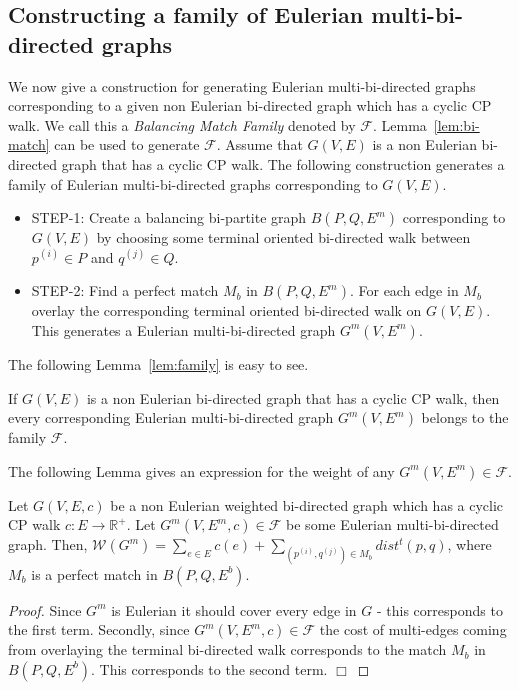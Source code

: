 \documentclass[runningheads]{llncs}
\begin{document}
\subsection{Constructing a family of Eulerian multi-bi-directed graphs}
We now give a construction for generating Eulerian multi-bi-directed graphs corresponding to a given non 
Eulerian bi-directed graph which has a cyclic CP walk. We call this a {\em Balancing Match Family} denoted
by $\mathcal{F}$. Lemma~\ref{lem:bi-match} can be used to generate $\mathcal{F}$. Assume that $G(V,E)$ is a non Eulerian bi-directed graph that has a cyclic CP walk. The following construction generates a
family of Eulerian multi-bi-directed graphs corresponding to $G(V,E)$.
\begin{itemize}
\item {\sf STEP-1:} Create a balancing bi-partite graph $B(P,Q,E^m)$ corresponding to $G(V,E)$ by choosing 
some terminal oriented bi-directed walk between $p^{(i)}\in P$ and $q^{(j)}\in Q$.
\item {\sf STEP-2:} Find a perfect match $M_b$ in $B(P,Q,E^m)$. For each edge in $M_b$ overlay the 
corresponding terminal oriented bi-directed walk on $G(V,E)$. This generates a Eulerian multi-bi-directed
graph $G^m(V,E^m)$.
\end{itemize}

The following Lemma~\ref{lem:family} is easy to see.
\begin{lemma}
\label{lem:family}
If $G(V,E)$ is a non Eulerian bi-directed graph that has a cyclic CP walk, then every corresponding
Eulerian multi-bi-directed graph $G^m(V,E^m)$ belongs to the family $\mathcal{F}$.
\end{lemma}

The following Lemma gives an expression for the weight of
any $G^m(V,E^m) \in \mathcal{F}$.
\begin{lemma}
\label{lem:weight}
Let $G(V,E,c)$ be a non Eulerian weighted bi-directed graph which has a cyclic CP walk $c: E\rightarrow \mathbb{R^+}$.
Let $G^m(V,E^m,c) \in \mathcal{F} $ be some Eulerian multi-bi-directed graph. Then, 
${\mathcal W}(G^m) = \displaystyle\sum_{e\in E} c(e) + \displaystyle\sum_{(p^{(i)},q^{(j)})\in M_b}dist^t(p,q)$, where 
$M_b$ is a perfect match in $B(P,Q,E^b)$.
\end{lemma}
\begin{proof}
Since $G^m$ is Eulerian it should cover every edge in $G$ - this corresponds to the first term. Secondly,
since $G^m(V,E^m,c) \in \mathcal{F}$ the cost of multi-edges coming from overlaying the terminal bi-directed
walk corresponds to the match $M_b$ in $B(P,Q,E^b)$. This corresponds to the second term. $\Box$
\end{proof}
\end{document}
